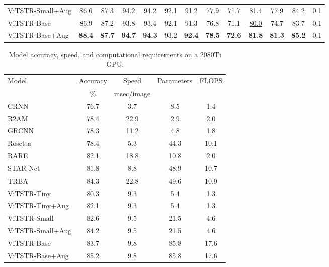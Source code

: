 \documentclass[runningheads]{llncs}
\begin{document}
\begin{table}[]
\begin{tabular}{l |c  c  c  c  c  c  c  c  c  c  c  c }
    ViTSTR-Small+Aug & 86.6	&87.3	&94.2	&94.2	&92.1	&91.2	&77.9	&71.7	&81.4	&77.9	&84.2	&0.1\\
    
    ViTSTR-Base &86.9	&87.2	&93.8	&93.4	&92.1	&91.3	&76.8	&71.1	&\underline{80.0}	&74.7	&83.7	&0.1\\
    
    ViTSTR-Base+Aug &\textbf{88.4}	&\textbf{87.7}	&\textbf{94.7}	&\textbf{94.3}	&93.2	&\textbf{92.4}	&\textbf{78.5}	&\textbf{72.6}	&\textbf{81.8}	&\textbf{81.3}	&\textbf{85.2}	&0.1\\
    
    \hline
    \end{tabular}

    \label{tab:model_acc}
\end{table}

\begin{table}[]
    \centering
    \caption{Model accuracy, speed, and computational requirements on a 2080Ti GPU.}
    \begin{tabular}{l|c c c c}
    \hline
     Model & Accuracy & Speed & Parameters & FLOPS  \\
     {} & \% & msec/image &  &  \\
     \hline
    CRNN \cite{shi2016end}& 76.7 & 3.7 & 8.5 & 1.4 \\
    R2AM \cite{lee2016recursive}& 78.4 & 22.9 & 2.9 & 2.0 \\
    GRCNN \cite{wang2017gated}& 78.3 & 11.2 & 4.8 & 1.8 \\
    Rosetta \cite{borisyuk2018rosetta}& 78.4 & 5.3 & 44.3 & 10.1\\
    RARE \cite{shi2016robust}& 82.1 & 18.8 & 10.8 & 2.0\\
    STAR-Net \cite{liu2016star}& 81.8 & 8.8 & 48.9 & 10.7\\
    TRBA \cite{baek2019wrong}& 84.3 & 22.8 & 49.6 & 10.9\\
    ViTSTR-Tiny & 80.3 & 9.3 & 5.4 & 1.3\\
    ViTSTR-Tiny+Aug & 82.1 & 9.3 & 5.4 & 1.3\\
    ViTSTR-Small & 82.6 & 9.5 & 21.5 & 4.6\\
    ViTSTR-Small+Aug & 84.2 & 9.5 & 21.5 & 4.6\\
    
    ViTSTR-Base & 83.7 & 9.8 & 85.8 & 17.6\\
    ViTSTR-Base+Aug & 85.2 & 9.8 & 85.8 & 17.6\\
    \hline     
    \end{tabular}

    \label{tab:model_speed}
\end{table}
\end{document}
